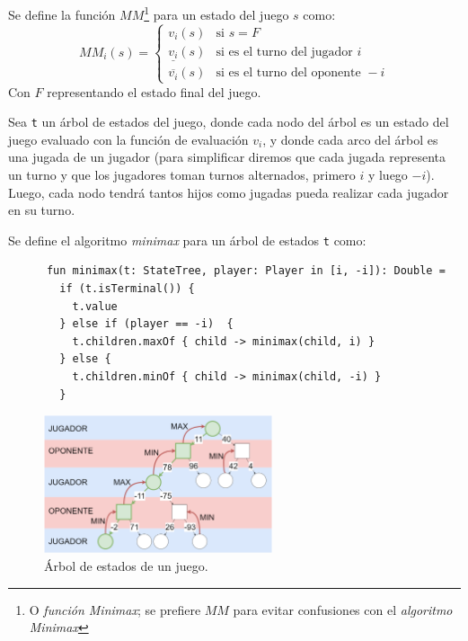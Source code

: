 
  \begin{definition}
    Se define la función \(MM\)\footnote{O \textit{función Minimax}; se prefiere \(MM\) para evitar 
    confusiones con el \textit{algoritmo Minimax}} para un estado del juego \(s\) como:
    \[
      MM_i(s) = \begin{cases}
        v_i(s) & \text{si } s = F  \\
        \underline{v_{i}}(s) & \text{si es el turno del jugador } i \\
        \overline{v_{i}}(s) & \text{si es el turno del oponente } -i
      \end{cases}  
    \]
    Con \(F\) representando el estado final del juego. 
  \end{definition}

  \begin{definition}
    Sea \texttt{t} un árbol de estados del juego, donde cada nodo del árbol es un estado del juego
    evaluado con la función de evaluación \(v_i\), y donde cada arco del árbol es una jugada de un
    jugador (para simplificar diremos que cada jugada representa un turno y que los jugadores 
    toman turnos alternados, primero \(i\) y luego \(-i\)).
    Luego, cada nodo tendrá tantos hijos como jugadas pueda realizar cada jugador en su turno.

    Se define el algoritmo \textit{minimax} para un árbol de estados \texttt{t} como:
    
    \begin{verbatim}
      fun minimax(t: StateTree, player: Player in [i, -i]): Double =
        if (t.isTerminal()) {
          t.value
        } else if (player == -i)  {
          t.children.maxOf { child -> minimax(child, i) }
        } else {
          t.children.minOf { child -> minimax(child, -i) }
        } 
    \end{verbatim}
  \end{definition}

  
  \begin{figure}[ht!]
    \centering
    \includegraphics[width=0.6\textwidth]{img/minimax.drawio.png}
    \caption{Árbol de estados de un juego.}
    \label{fig:minimax-tree}
  \end{figure}

